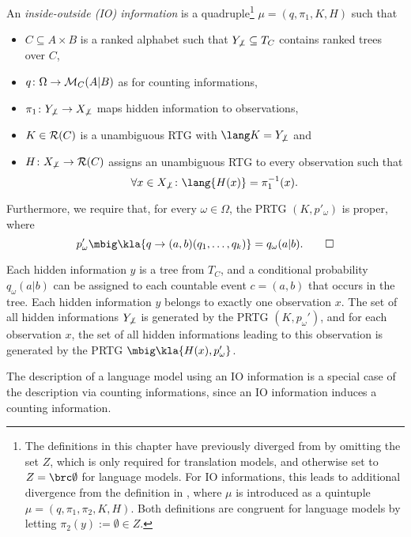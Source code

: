 \begin{definition}\label{02:def-io-info}
 An \emph{inside-outside (IO) information} is a quadruple\footnote{The definitions
 in this chapter have previously diverged from \cite{bucstuvog15} by omitting
 the set $Z$, which is only required for translation models, and otherwise set
 to $Z=\brc\emptyset$ for language models. For IO informations, this leads to
 additional divergence from the definition in \cite{bucstuvog15}, where $\mu$
 is introduced as a quintuple $\mu=(q,\pi_1,\pi_2,K,H)$. Both definitions are
 congruent for language models by letting $\pi_2(y) :=
 \emptyset\in Z$.} $\mu = (q,\pi_1,K,H)$ such that
 \begin{itemize}\setlength\itemsep{-0.3em}
  \item $C\subseteq A\times B$ is a ranked alphabet such that $Y_{\not\bot}\subseteq T_C$ contains ranked trees over $C$,
  \item $q\colon\Omega\to\mathcal M_C(A|B)$ as for counting informations,
  \item $\pi_1\colon Y_{\not\bot}\to X_{\not\bot}$ maps hidden information to observations,
  \item $K\in\mathcal R(C)$ is a unambiguous RTG with $\lang K = Y_{\not\bot}$ and
  \item $H\colon X_{\not\bot}\to\mathcal R(C)$ assigns an unambiguous RTG to every observation such that 
   \[
    \forall x\in X_{\not\bot}\colon \lang{H(x)} = \pi_1^{-1}(x).
   \]
 \end{itemize}
 Furthermore, we require that, for every $\omega\in\Omega$, the PRTG $(K,p'_\omega)$ is proper, where
 \[
  p'_\omega\mbig\kla{q\to(a,b)(q_1,\ldots,q_k)} = q_\omega(a|b).
  \qedhere
 \]
\end{definition}

Each hidden information $y$ is a tree from $T_C$, and a conditional probability
$q_\omega(a|b)$ can be assigned to each countable event $c = (a,b)$ that occurs
in the tree. Each hidden information $y$ belongs to exactly one observation
$x$. The set of all hidden informations $Y_{\not\bot}$ is generated by the PRTG
$(K,p_\omega')$, and for each observation $x$, the set of all hidden
informations leading to this observation is generated by the PRTG
$\mbig\kla{H(x),p_\omega'}$.

The description of a language model using an IO information is a special case of
the description via counting informations, since an IO information induces a
counting information.

